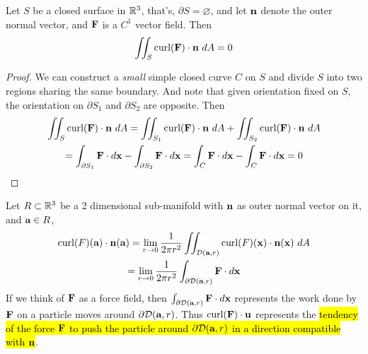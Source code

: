 \documentclass[11pt]{article}
\begin{document}
			\begin{corollary}
				Let $S$ be a closed surface in $\mathbb{R}^3$, that's, $\partial S = \varnothing$, and let $\textbf{n}$ denote the outer normal vector, and $\textbf{F}$ is a $C^1$ vector field. Then
				\begin{equation}
					\iint_S \text{curl}(\textbf{F}) \cdot \textbf{n}\ dA = 0
				\end{equation}
				\begin{proof}
					We can construct a \emph{small} simple closed curve $C$ on $S$ and divide $S$ into two regions sharing the same boundary. And note that given orientation fixed on $S$, the orientation on $\partial S_1$ and $\partial S_2$ are opposite. Then
					\begin{gather}
						\iint_S \text{curl}(\textbf{F})\cdot \textbf{n}\ dA = \iint_{S_1} \text{curl}(\textbf{F})\cdot \textbf{n}\ dA + \iint_{S_2} \text{curl}(\textbf{F})\cdot \textbf{n}\ dA \\
						= \int_{\partial S_1} \textbf{F} \cdot d\textbf{x} - \int_{\partial S_2} \textbf{F} \cdot d\textbf{x}
						= \int_{C} \textbf{F} \cdot d\textbf{x} - \int_{C} \textbf{F} \cdot d\textbf{x} = 0
					\end{gather}
				\end{proof}
			\end{corollary}
			
			\begin{proposition}
				Let $R \subset \mathbb{R}^3$ be a 2 dimensional sub-manifold with $\textbf{n}$ as outer normal vector on it, and $\textbf{a} \in R$, 
				\begin{gather}
					\text{curl}(F)(\textbf{a}) \cdot \textbf{n}(\textbf{a}) 
					= \lim_{r \to 0} \frac{1}{2\pi r^2} \iint_{\mathcal{{D}}(\textbf{a}, r)} \text{curl}(F)(\textbf{x}) \cdot \textbf{n}(\textbf{x})\ dA \\
					= \lim_{r \to 0} \frac{1}{2\pi r^2} \int_{\partial \mathcal{{D}}(\textbf{a}, r)} \textbf{F} \cdot d\textbf{x} \\
				\end{gather}
				If we think of $\textbf{F}$ as a force field, then $\int_{\partial \mathcal{{D}}(\textbf{a}, r)} \textbf{F} \cdot d\textbf{x}$ represents the work done by $\textbf{F}$ on a particle moves around $\partial \mathcal{{D}}(\textbf{a}, r)$. Thus $\text{curl}(\textbf{F}) \cdot \textbf{u}$ represents the \hl{tendency of the force $\textbf{F}$ to push the particle around $\partial \mathcal{{D}}(\textbf{a}, r)$ in a direction compatible with $\textbf{n}$}.
			\end{proposition}
			
\end{document}
